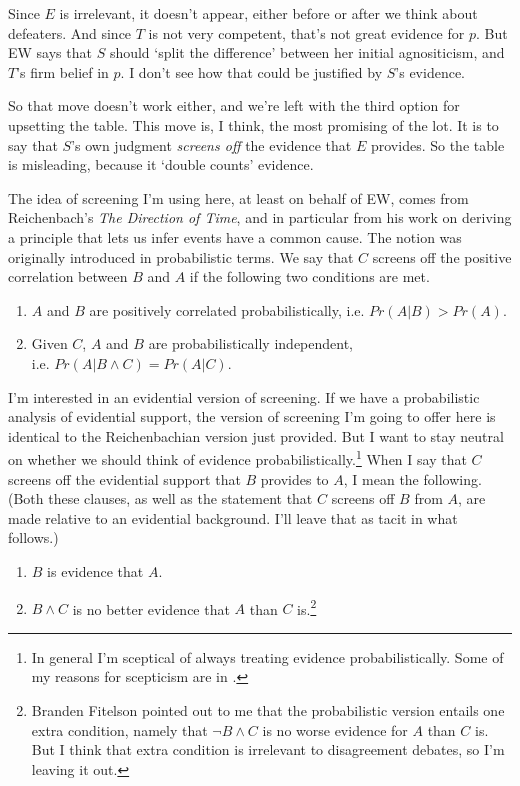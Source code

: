 \noindent Since $E$ is irrelevant, it doesn't appear, either before or after we think about defeaters. And since $T$ is not very competent, that's not great evidence for $p$. But EW says that $S$ should `split the difference' between her initial agnositicism, and $T$'s firm belief in $p$. I don't see how that could be justified by $S$'s evidence.

So that move doesn't work either, and we're left with the third option for upsetting the table. This move is, I think, the most promising of the lot. It is to say that $S$'s own judgment \textit{screens off} the evidence that $E$ provides. So the table is misleading, because it `double counts' evidence.

The idea of screening I'm using here, at least on behalf of EW, comes from Reichenbach's \textit{The Direction of Time}, \nocite{Reichenbach1956} and in particular from his work on deriving a principle that lets us infer events have a common cause. The notion was originally introduced in probabilistic terms. We say that \(C\) screens off the positive correlation between \(B\) and \(A\) if the following two conditions are met.

\begin{enumerate}
\item \(A\) and \(B\) are positively correlated probabilistically, i.e. \(Pr(A | B) > Pr(A)\).
\item  Given \(C\), \(A\) and \(B\) are probabilistically independent, \\ i.e. \(Pr(A | B \wedge C) = Pr(A | C)\).
\end{enumerate}

\noindent I'm interested in an evidential version of screening. If we have a probabilistic analysis of evidential support, the version of screening I'm going to offer here is identical to the Reichenbachian version just provided. But I want to stay neutral on whether we should think of evidence probabilistically.\footnote{In general I'm sceptical of always treating evidence probabilistically. Some of my reasons for scepticism are in \citet{Weatherson2007}.} When I say that \(C\) screens off the evidential support that \(B\) provides to \(A\), I mean the following. (Both these clauses, as well as the statement that \(C\) screens off \(B\) from \(A\), are made relative to an evidential background. I'll leave that as tacit in what follows.)

\begin{enumerate}
\item \(B\) is evidence that \(A\).
\item  \(B \wedge C\) is no better evidence that \(A\) than \(C\) is.\footnote{Branden Fitelson pointed out to me that the probabilistic version entails one extra condition, namely that  \(\neg B \wedge C\) is no worse evidence for \(A\) than \(C\) is. But I think that extra condition is irrelevant to disagreement debates, so I'm leaving it out.}
\end{enumerate}

